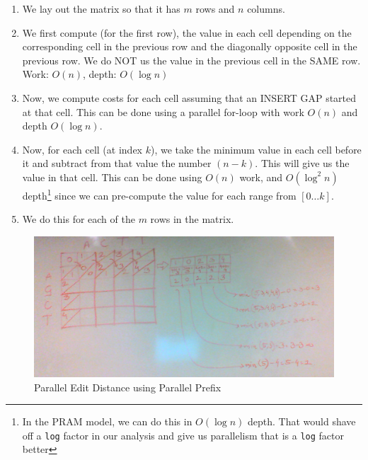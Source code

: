 \documentclass{article}
\begin{document}
\begin{enumerate}

\item We lay out the matrix so that it has $m$ rows and $n$ columns.

\item We first compute (for the first row), the value in each cell
  depending on the corresponding cell in the previous row and the
  diagonally opposite cell in the previous row. We do NOT us the value
  in the previous cell in the SAME row. Work: $O(n)$, depth: $O(\log{n})$

\item Now, we compute costs for each cell assuming that an INSERT GAP
  started at that cell. This can be done using a parallel for-loop
  with work $O(n)$ and depth $O(\log{n})$.

\item Now, for each cell (at index $k$), we take the minimum value in
  each cell before it and subtract from that value the number
  $(n-k)$. This will give us the value in that cell. This can be done
  using $O(n)$ work, and $O(\log^2{n})$ depth\footnote{In the PRAM
    model, we can do this in $O(\log{n})$ depth. That would shave off
    a \texttt{log} factor in our analysis and give us parallelism that
    is a \texttt{log} factor better} since we can pre-compute the
  value for each range from $[0 \ldots{} k]$.

\item We do this for each of the $m$ rows in the matrix.

\end{enumerate}

\begin{figure}[h!]
  \begin{center}
    \includegraphics[width=6in]{images/edit_diatance_using_parallel_prefix_small.png}
    \caption{Parallel Edit Distance using Parallel Prefix}
    \label{fig:pareditdistance}
  \end{center}
\end{figure}
\end{document}
